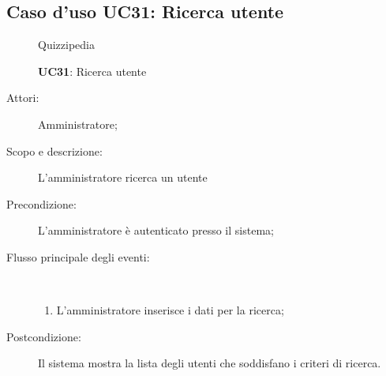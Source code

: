 \subsection{Caso d'uso UC31: Ricerca utente}
\begin{figure}[H]
	\centering
	\begin{resizedtikzpicture}{\textwidth}
		\begin{umlsystem}[x=0, fill=lightgray!20]{Quizzipedia}
		\end{umlsystem}
	\end{resizedtikzpicture}
	\caption{\textbf{UC31}: Ricerca utente}
	\label{UC31}
\end{figure}
\begin{description}
	\item[Attori:] Amministratore;
	\item[Scopo e descrizione:] L'amministratore ricerca un utente
	\item[Precondizione:] L'amministratore è autenticato presso il sistema;
	
	\item[Flusso principale degli eventi:] \ 
	\begin{enumerate}
		\item L'amministratore inserisce i dati per la ricerca;
		
	\end{enumerate}
	\item[Postcondizione:] Il sistema mostra la lista degli utenti che soddisfano i criteri di ricerca.
\end{description}
\hypertarget{UC32}{}
